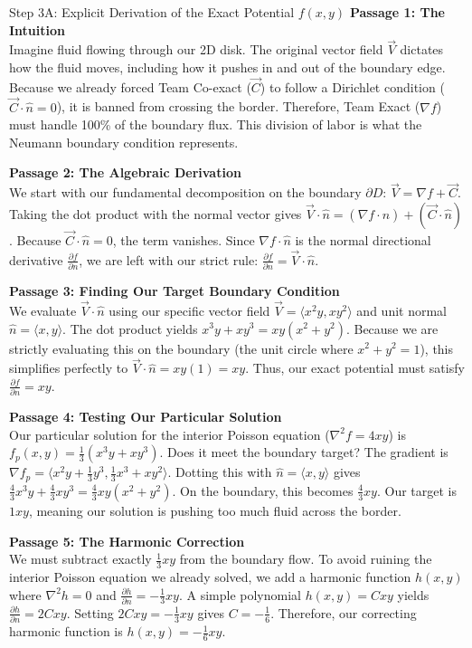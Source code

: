 \documentclass[11pt]{article}
\begin{document}
\begin{stepbox}{Step 3A: Explicit Derivation of the Exact Potential $f(x,y)$}
\textbf{Passage 1: The Intuition}\\
Imagine fluid flowing through our 2D disk. The original vector field $\vec{V}$ dictates how the fluid moves, including how it pushes in and out of the boundary edge. Because we already forced Team Co-exact ($\vec{C}$) to follow a Dirichlet condition ($\vec{C} \cdot \hat{n} = 0$), it is banned from crossing the border. Therefore, Team Exact ($\nabla f$) must handle 100\% of the boundary flux. This division of labor is what the Neumann boundary condition represents.

\textbf{Passage 2: The Algebraic Derivation}\\
We start with our fundamental decomposition on the boundary $\partial D$: $\vec{V} = \nabla f + \vec{C}$. Taking the dot product with the normal vector gives $\vec{V} \cdot \hat{n} = (\nabla f \cdot \hat{n}) + (\vec{C} \cdot \hat{n})$. Because $\vec{C} \cdot \hat{n} = 0$, the term vanishes. Since $\nabla f \cdot \hat{n}$ is the normal directional derivative $\frac{\partial f}{\partial n}$, we are left with our strict rule: $\frac{\partial f}{\partial n} = \vec{V} \cdot \hat{n}$.

\textbf{Passage 3: Finding Our Target Boundary Condition}\\
We evaluate $\vec{V} \cdot \hat{n}$ using our specific vector field $\vec{V} = \langle x^2y, xy^2 \rangle$ and unit normal $\hat{n} = \langle x, y \rangle$. The dot product yields $x^3y + xy^3 = xy(x^2 + y^2)$. Because we are strictly evaluating this on the boundary (the unit circle where $x^2 + y^2 = 1$), this simplifies perfectly to $\vec{V} \cdot \hat{n} = xy(1) = xy$. Thus, our exact potential must satisfy $\frac{\partial f}{\partial n} = xy$.

\textbf{Passage 4: Testing Our Particular Solution}\\
Our particular solution for the interior Poisson equation ($\nabla^2 f = 4xy$) is $f_p(x,y) = \frac{1}{3}(x^3y + xy^3)$. Does it meet the boundary target? The gradient is $\nabla f_p = \langle x^2y + \frac{1}{3}y^3, \frac{1}{3}x^3 + xy^2 \rangle$. Dotting this with $\hat{n} = \langle x,y \rangle$ gives $\frac{4}{3}x^3y + \frac{4}{3}xy^3 = \frac{4}{3}xy(x^2 + y^2)$. On the boundary, this becomes $\frac{4}{3}xy$. Our target is $1xy$, meaning our solution is pushing too much fluid across the border.

\textbf{Passage 5: The Harmonic Correction}\\
We must subtract exactly $\frac{1}{3}xy$ from the boundary flow. To avoid ruining the interior Poisson equation we already solved, we add a harmonic function $h(x,y)$ where $\nabla^2 h = 0$ and $\frac{\partial h}{\partial n} = -\frac{1}{3}xy$. A simple polynomial $h(x,y) = Cxy$ yields $\frac{\partial h}{\partial n} = 2Cxy$. Setting $2Cxy = -\frac{1}{3}xy$ gives $C = -\frac{1}{6}$. Therefore, our correcting harmonic function is $h(x,y) = -\frac{1}{6}xy$.


\end{stepbox}
\end{document}
